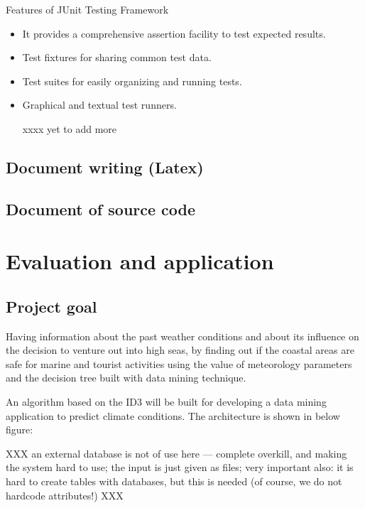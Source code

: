 \documentclass{article}
\begin{document}
Features of JUnit Testing Framework
\begin{itemize}

\item It provides a comprehensive assertion facility to test expected results.
\item Test fixtures for sharing common test data.
\item Test suites for easily organizing and running tests.
\item Graphical and textual test runners.

xxxx yet to add more 

\end{itemize}

\subsection{Document writing (Latex)}
\label{sec:latex}





\subsection{Document of source code}
\label{sec:documentsource}
\pagebreak

\section{Evaluation and application}
\label{sec:eval}

\subsection{Project goal}
\label{sec:goal}

Having information about the past weather conditions and about its influence on the decision to venture out into high
seas, by finding out if the coastal areas are safe for marine and tourist activities using the value of meteorology parameters and the decision tree built with data mining technique.

An algorithm based on the ID3 will be built for developing a data mining application to predict climate conditions.
The architecture is shown in below figure:

XXX an external database is not of use here --- complete overkill, and making
the system hard to use; the input is just given as files; very important also:
it is hard to create tables with databases, but this is needed (of course,
we do not hardcode attributes!) XXX
\end{document}
